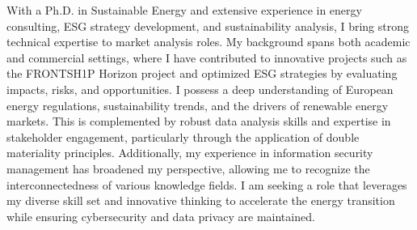 

\begin{cvparagraph}

    With a Ph.D. in Sustainable Energy and extensive experience in energy consulting, ESG strategy development, and sustainability analysis, I bring strong technical expertise to market analysis roles. My background spans both academic and commercial settings, where I have contributed to innovative projects such as the FRONTSH1P Horizon project and optimized ESG strategies by evaluating impacts, risks, and opportunities. I possess a deep understanding of European energy regulations, sustainability trends, and the drivers of renewable energy markets. This is complemented by robust data analysis skills and expertise in stakeholder engagement, particularly through the application of double materiality principles. Additionally, my experience in information security management has broadened my perspective, allowing me to recognize the interconnectedness of various knowledge fields. I am seeking a role that leverages my diverse skill set and innovative thinking to accelerate the energy transition while ensuring cybersecurity and data privacy are maintained.
\end{cvparagraph}
